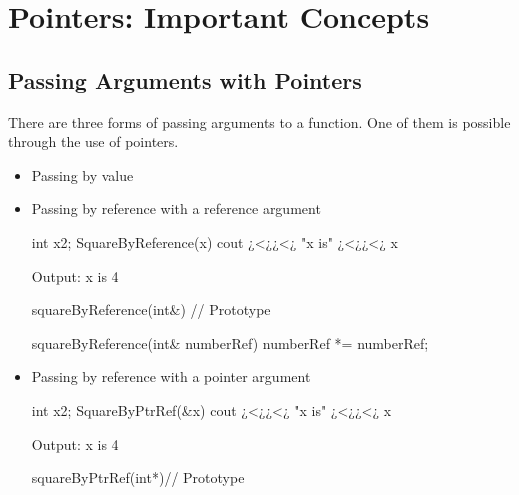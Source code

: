\section{Pointers: Important Concepts}
\label{sec:Pointers-ImportantConcepts}
\subsection{Passing Arguments with Pointers}
\label{subsec:Pointers-02-ImportantConcepts-PassingArguments}

There are three forms of passing arguments to a function. One of them is possible through the use of pointers.
\begin{itemize}
    \item Passing by value
    \item Passing by reference with a reference argument\\
    \begin{minipage}{\MPWxXXSxLISTING\textwidth} %
    \begin{CPPCode}
int x{2};
SquareByReference(x)
cout ¿<¿¿<¿ "x is" ¿<¿¿<¿ x 
    \end{CPPCode}
    \begin{Terminal}
Output:
x is 4
    \end{Terminal}
    \end{minipage}
    \begin{minipage}{\MPWxXSxLISTING\textwidth} %
    \begin{CPPCode}
squareByReference(int&) // Prototype

squareByReference(int& numberRef)
{
    numberRef *= numberRef;
}
    \end{CPPCode}
    \end{minipage}
    
    \item Passing by reference with a pointer argument\\
    \begin{minipage}{\MPWxXXSxLISTING\textwidth} %
    \begin{CPPCode}
int x{2};
SquareByPtrRef(&x)
cout ¿<¿¿<¿ "x is" ¿<¿¿<¿ x 
    \end{CPPCode}
    \begin{Terminal}
Output:
x is 4
    \end{Terminal}
    \end{minipage}
    \begin{minipage}{\MPWxXSxLISTING\textwidth} %
    \begin{CPPCode}
squareByPtrRef(int*)// Prototype


\end{CPPCode}
\end{minipage}
\end{itemize}
